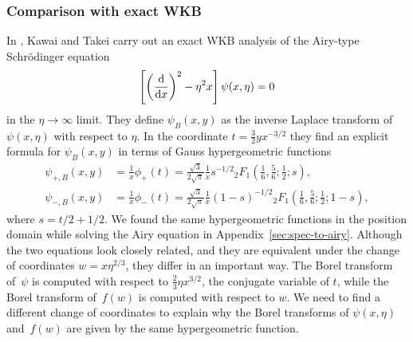 \documentclass[10pt,a4paper]{amsart}
\numberwithin{equation}{section}
\begin{document}
\subsubsection{Comparison with exact WKB}
%
In \cite{kawai-takei}, Kawai and Takei carry out an exact WKB analysis of the Airy-type Schr\"{o}dinger equation%
\begin{equation}
\label{WKB_Airy}
\left[\left(\frac{\rm d}{{\rm d}x}\right)^2 - \eta^2 x \right] \psi(x, \eta) = 0
\end{equation}
in the $\eta \to \infty$ limit. They define $\psi_B(x, y)$ as the inverse Laplace transform of $\psi(x, \eta)$ with respect to $\eta$. In the coordinate $t=\frac{3}{2}yx^{-3/2}$ they find an explicit formula for $\psi_B(x,y)$ in terms of Gauss hypergeometric functions
\begin{align*}
\psi_{+,B}(x,y)&=\frac{1}{x}\phi_+(t)=\frac{\sqrt{3}}{2\sqrt{\pi}}\frac{1}{x}s^{-1/2} {}_2F_1\left(\frac{1}{6},\frac{5}{6};\frac{1}{2};s\right),\\
\psi_{-,B}(x,y)&=\frac{1}{x}\phi_-(t)=\frac{\sqrt{3}}{2\sqrt{\pi}}\frac{1}{x}(1-s)^{-1/2} {}_2F_1\left(\frac{1}{6},\frac{5}{6};\frac{1}{2};1-s\right),
\end{align*}
where $s=t/2+1/2$. We found the same hypergeometric functions in the position domain while solving the Airy equation
in Appendix~\ref{sec:spec-to-airy}. Although the two equations look closely related, and they are equivalent under the change of coordinates $w=x\eta^{2/3}$, they differ in an important way. The Borel transform of~$\psi$ is computed with respect to $\frac{2}{3}\eta x^{3/2}$, the conjugate variable of $t$, while the Borel transform of~$f(w)$ is computed with respect to $w$. We need to find a different change of coordinates to explain why the Borel transforms of $\psi(x,\eta)$ and~$f(w)$ are given by the same hypergeometric function.
\end{document}
